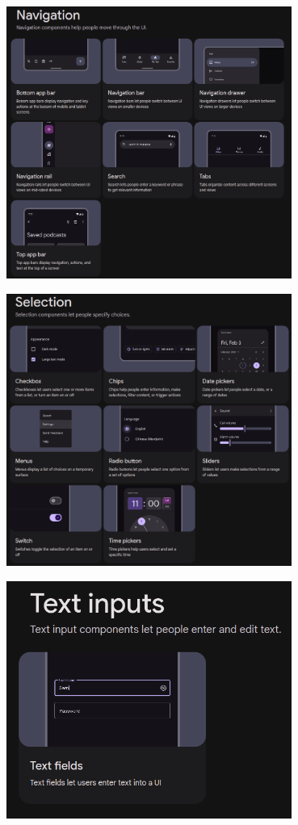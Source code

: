\documentclass[12pt]{beamer}
\begin{document}
	\begin{frame}
        \begin{center}
            \includegraphics[width=0.7\textwidth]{navigation.png}
        \end{center}
    \end{frame}

    \begin{frame}
        \begin{center}
            \includegraphics[width=0.7\textwidth]{selection.png}
        \end{center}
    \end{frame}

    \begin{frame}
        \begin{center}
            \includegraphics[width=0.7\textwidth]{text-inputs.png}
        \end{center}
    \end{frame}
\end{document}
